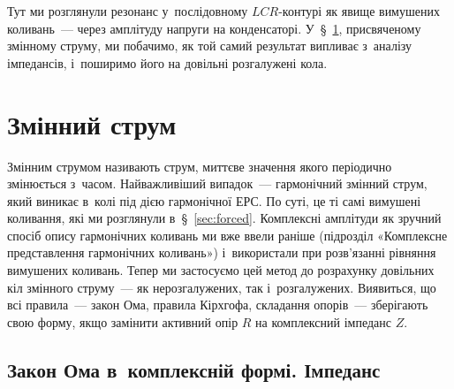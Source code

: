 Тут ми розглянули резонанс у~послідовному $LCR$-контурі як явище вимушених коливань~--- через амплітуду напруги на конденсаторі. У~\S~\ref{sec:ac}, присвяченому змінному струму, ми побачимо, як той самий результат випливає з~аналізу імпедансів, і~поширимо його на довільні розгалужені кола.

\section{Змінний струм}\label{sec:ac}\hypertarget{ac-current}{}

Змінним струмом називають струм, миттєве значення якого періодично змінюється з~часом. Найважливіший випадок~--- гармонічний змінний струм, який виникає в~колі під дією гармонічної ЕРС. По суті, це ті самі вимушені коливання, які ми розглянули в~\S~\ref{sec:forced}. Комплексні амплітуди як зручний спосіб опису гармонічних коливань ми вже ввели раніше (підрозділ «Комплексне представлення гармонічних коливань») і~використали при розв'язанні рівняння вимушених коливань. Тепер ми застосуємо цей метод до розрахунку довільних кіл змінного струму~--- як нерозгалужених, так і~розгалужених. Виявиться, що всі правила~--- закон Ома, правила Кірхгофа, складання опорів~--- зберігають свою форму, якщо замінити активний опір $R$ на комплексний імпеданс $Z$.


\subsection*{Закон Ома в~комплексній формі. Імпеданс}

